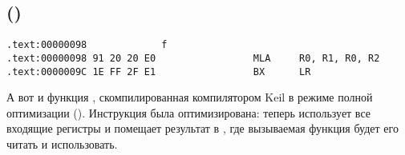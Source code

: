 ﻿\subsection{\OptimizingKeilVI (\ARMMode)}

\begin{lstlisting}[label=ARM_leaf_example1]
.text:00000098             f
.text:00000098 91 20 20 E0                 MLA     R0, R1, R0, R2
.text:0000009C 1E FF 2F E1                 BX      LR
\end{lstlisting}

А вот и функция \ttf, скомпилированная компилятором Keil в режиме полной оптимизации (\Othree).
Инструкция \MOV была оптимизирована: теперь  использует все входящие регистры 
и помещает результат в , где вызываемая функция будет его читать и использовать.

